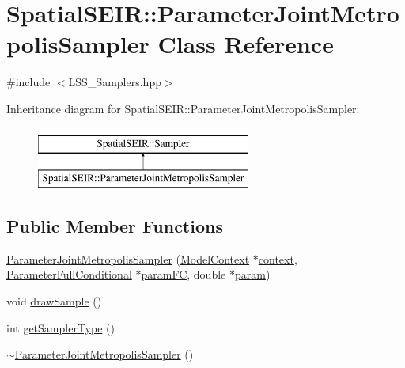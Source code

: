 \hypertarget{classSpatialSEIR_1_1ParameterJointMetropolisSampler}{\section{Spatial\-S\-E\-I\-R\-:\-:Parameter\-Joint\-Metropolis\-Sampler Class Reference}
\label{classSpatialSEIR_1_1ParameterJointMetropolisSampler}
}


{\ttfamily \#include $<$L\-S\-S\-\_\-\-Samplers.\-hpp$>$}

Inheritance diagram for Spatial\-S\-E\-I\-R\-:\-:Parameter\-Joint\-Metropolis\-Sampler\-:\begin{figure}[H]
\begin{center}
\leavevmode
\includegraphics[height=2.000000cm]{classSpatialSEIR_1_1ParameterJointMetropolisSampler}
\end{center}
\end{figure}
\subsection*{Public Member Functions}
\begin{DoxyCompactItemize}
\item 
\hyperlink{classSpatialSEIR_1_1ParameterJointMetropolisSampler_a86159a1b20311138c9b96339c6512276}{Parameter\-Joint\-Metropolis\-Sampler} (\hyperlink{classSpatialSEIR_1_1ModelContext}{Model\-Context} $\ast$\hyperlink{classSpatialSEIR_1_1ParameterJointMetropolisSampler_a342dea442e235b1deefe2c16dd3e95e8}{context}, \hyperlink{classSpatialSEIR_1_1ParameterFullConditional}{Parameter\-Full\-Conditional} $\ast$\hyperlink{classSpatialSEIR_1_1ParameterJointMetropolisSampler_a2ceafdb76768003ed5eaa4b22ca6afeb}{param\-F\-C}, double $\ast$\hyperlink{classSpatialSEIR_1_1ParameterJointMetropolisSampler_afead5b10ba404c235e7042670c350eeb}{param})
\item 
void \hyperlink{classSpatialSEIR_1_1ParameterJointMetropolisSampler_a1224be64e1a5e46290c6f2d95b13fec7}{draw\-Sample} ()
\item 
int \hyperlink{classSpatialSEIR_1_1ParameterJointMetropolisSampler_a5684e2933ff1fab50e1761450ba41897}{get\-Sampler\-Type} ()
\item 
\hyperlink{classSpatialSEIR_1_1ParameterJointMetropolisSampler_a726371badc62d132c336759f9ca965be}{$\sim$\-Parameter\-Joint\-Metropolis\-Sampler} ()
\end{DoxyCompactItemize}
